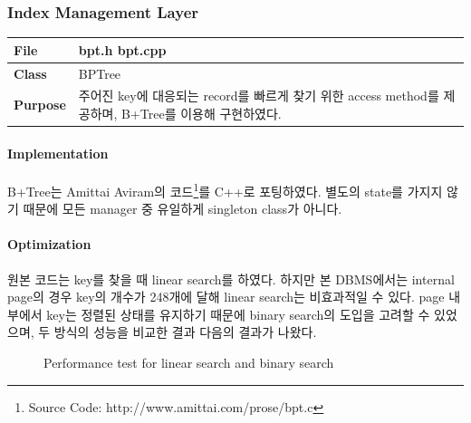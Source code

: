 \documentclass[main.tex]{subfiles}
\begin{document}
\newpage
\subsubsection{Index Management Layer}
\begin{table}[!htb]
	\begin{tabularx}{\textwidth}{|l|X|}
		\hline
		\textbf{File} & bpt.h bpt.cpp \\
		\hline
		\textbf{Class} & BPTree \\
		\hline
		\textbf{Purpose} & 주어진 key에 대응되는 record를 빠르게 찾기 위한 access method를 제공하며, B+Tree를 이용해 구현하였다. \\
		\hline
	\end{tabularx}
\end{table}

\paragraph{Implementation}
B+Tree는 Amittai Aviram의 코드\footnote{Source Code: http://www.amittai.com/prose/bpt.c}를 C++로 포팅하였다.
별도의 state를 가지지 않기 때문에 모든 manager 중 유일하게 singleton class가 아니다.

\paragraph{Optimization}
원본 코드는 key를 찾을 때 linear search를 하였다. 하지만 본 DBMS에서는 internal page의 경우 key의 개수가 248개에 달해 linear search는 비효과적일 수 있다.
page 내부에서 key는 정렬된 상태를 유지하기 때문에 binary search의 도입을 고려할 수 있었으며, 두 방식의 성능을 비교한 결과 다음의 결과가 나왔다.

\begin{figure}[!htb]
	\centering
	\caption{Performance test for linear search and binary search}
\end{figure}
\end{document}
